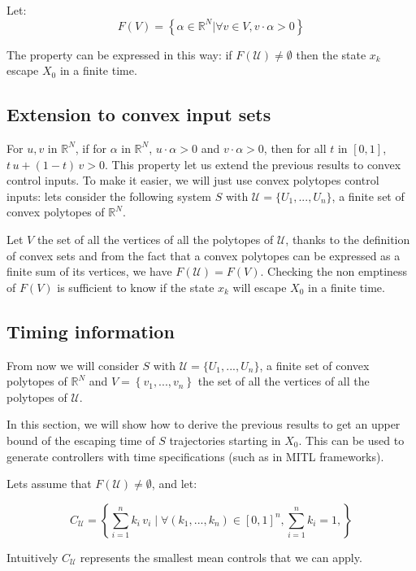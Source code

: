 \documentclass[12pt]{article}
\begin{document}
Let:
$$F(V) = \left \{ \alpha \in \mathbb{R}^N| \forall v \in V, v \cdot \alpha >0 \right \}$$

The property can be expressed in this way:
if $F(\mathcal{U}) \neq \emptyset$ then the state $x_k$ escape $X_0$ in a finite time.

\subsection*{Extension to convex input sets}

For $u,v$ in $\mathbb{R}^N$, if for $\alpha$ in $\mathbb{R}^N$, $u \cdot \alpha > 0$ and $v \cdot \alpha > 0$, then for all $t$ in $[0,1]$, $t \, u + (1-t) \, v > 0$.
This property let us extend the previous results to convex control inputs.
To make it easier, we will just use convex polytopes control inputs:
lets consider the following system $S$ with $\mathcal{U} = \{U_1,...,U_n\}$, a finite set of convex polytopes of $\mathbb{R}^N$.


Let $V$ the set of all the vertices of all the polytopes of $\mathcal{U}$, thanks to the definition of convex sets and from the fact that a convex polytopes can be expressed as a finite sum of its vertices, we have $F(\mathcal{U}) = F(V)$.
Checking the non emptiness of $F(V)$ is sufficient to know if the state $x_k$ will escape $X_0$ in a finite time.

\subsection*{Timing  information}
From now we will consider $S$ with $\mathcal{U} = \{U_1,...,U_n\}$, a finite set of convex polytopes of $\mathbb{R}^N$ and $V = \left \{v_1,...,v_n \right \}$ the set of all the vertices of all the polytopes of $\mathcal{U}$.

In this section, we will show how to derive the previous results to get an upper bound of the escaping time of $S$ trajectories starting in $X_0$.
This can be used to generate controllers with time specifications (such as in MITL frameworks).

Lets assume that $F(\mathcal{U}) \neq \emptyset$, and let:

\begin{equation}
C_\mathcal{U}=
\left \{
\sum_{i=1}^n k_i \, v_i
\mid 
\forall (k_1,...,k_n) \in [0,1]^n,
\sum_{i=1}^n k_i = 1,
\right \}
\end{equation}

Intuitively $C_\mathcal{U}$ represents the smallest mean controls that we can apply.
\end{document}
